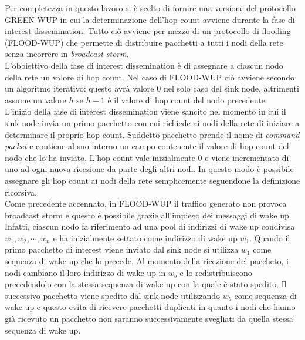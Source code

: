 \documentclass[binding=0.6cm,TFA]{sapthesis}
\begin{document}
Per completezza in questo lavoro si è scelto di fornire una versione del protocollo GREEN-WUP in cui la determinazione dell'hop count avviene
durante la fase di interest dissemination. Tutto ciò avviene per mezzo di un protocollo di flooding (FLOOD-WUP) che permette di distribuire pacchetti
a tutti i nodi della rete senza incorrere in \emph{broadcast storm}.\\

L'obbiettivo della fase di interest dissemination è di assegnare a ciascun nodo della rete un valore di hop count. Nel caso di FLOOD-WUP ciò
avviene secondo un algoritmo iterativo: questo avrà valore 0 nel solo caso del sink node, altrimenti assume un valore $h$ se $h-1$ è il valore
di hop count del nodo precedente.\\

L'inizio della fase di interest dissemination viene sancito nel momento in cui il sink node invia un primo pacchetto con cui richiede
ai nodi della rete di iniziare a determinare il proprio hop count. Suddetto pacchetto prende il nome di \emph{command packet} e contiene
al suo interno un campo contenente il valore di hop count del nodo che lo ha inviato. L'hop count vale inizialmente 0 
e viene incrementato di uno ad ogni nuova ricezione da parte degli altri nodi. In questo modo è possibile assegnare gli hop count ai nodi
della rete semplicemente seguendone la definizione ricorsiva.\\

Come precedente accennato, in FLOOD-WUP il traffico generato non provoca broadcast storm e questo è possibile grazie all'impiego dei messaggi
di wake up. Infatti, ciascun nodo fa riferimento ad una pool di indirizzi di wake up condivisa $w_1, w_2, \cdots, w_n$ e ha inizialmente
settato come indirizzo di wake up $w_1$. Quando il primo pacchetto di interest viene inviato dal sink node si utilizza $w_1$ come sequenza
di wake up che lo precede. Al momento della ricezione del paccheto, i nodi cambiano il loro indirizzo di wake up in $w_b$ e lo redistribuiscono
precedendolo con la stessa sequenza di wake up con la quale è stato spedito. Il successivo pacchetto viene spedito dal sink
node utilizzando $w_b$ come sequenza di wake up e questo evita di ricevere pacchetti duplicati in quanto i nodi che hanno già ricevuto un
pacchetto non saranno successivamente svegliati da quella stessa sequenza di wake up.
\end{document}
